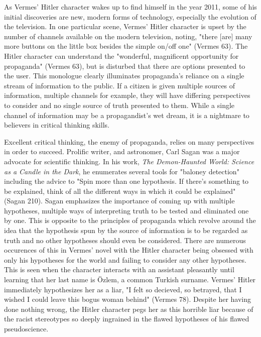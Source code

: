 \documentclass[12pt]{article}
\begin{document}
As Vermes' Hitler character wakes up to find himself in the year 2011, some of his initial discoveries are
new, modern forms of technology, especially the evolution of the television. In one particular scene,
Vermes' Hitler character is upset by the number of channels available on the modern television, 
noting, "there [are] many more buttons on the little box besides the simple on/off one" (Vermes 63).
The Hitler character can understand the "wonderful, magnificent opportunity for propaganda" (Vermes 63), but
is disturbed that there are options presented to the user. This monologue clearly illuminates propaganda's 
reliance on a single stream of information to the public. If a citizen is given multiple sources of information,
multiple channels for example, they will have differing perspectives to consider and no single source of truth
presented to them. While a single channel of information may be a propagandist's wet dream, it is a nightmare to
believers in critical thinking skills.

Excellent critical thinking, the enemy of propaganda, relies on many perspectives in order to succeed. Prolific writer, and
astronomer, Carl Sagan was a major advocate for scientific thinking. In his work,
\textit{The Demon-Haunted World: Science as a Candle in the Dark},
he enumerates several tools for "baloney detection" including the advice to
"Spin more than one hypothesis. If there’s something to be explained, 
think of all the different ways in which it could be explained" (Sagan 210).
Sagan emphasizes the importance of coming up with multiple hypotheses, multiple ways of 
interpreting truth to be tested and eliminated one by one. This is opposite to the principles of propaganda
which revolve around the idea that the hypothesis spun by the source of information is to be regarded
as truth and no other hypotheses should even be considered. There are numerous occurences of this in Vermes'
novel with the Hitler character being obsessed with only his hypotheses for the world and failing to consider any
other hypotheses. This is seen when the character interacts with an assistant pleasantly until learning
that her last name is Özlem, a common Turkish surname. Vermes' Hitler immediately hypothesizes her as a liar,
"I felt so decieved, so betrayed, that I wished I could leave this bogus woman behind" (Vermes 78).
Despite her having done nothing wrong, the Hitler character pegs her as this horrible liar because of the
racist stereotypes so deeply ingrained in the flawed hypotheses of his flawed pseudoscience.
\end{document}
